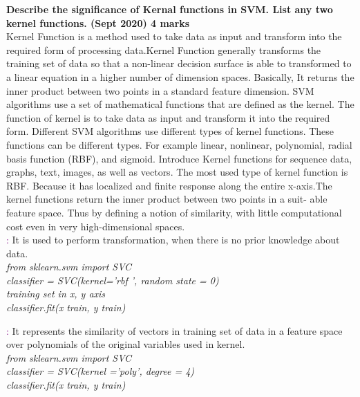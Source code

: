 \textbf{\textcolor{LightMagenta}{Describe the significance of Kernal functions in SVM. List any two kernel functions. (Sept 2020) \hfill 4 marks}} \\[5pt]
Kernel Function is a method used to take data as input and transform into the
required form of processing data.Kernel Function generally transforms the training set of
data so that a non-linear decision surface is able to transformed to a linear equation in a
higher number of dimension spaces. Basically, It returns the inner product between two
points in a standard feature dimension.
SVM algorithms use a set of mathematical functions that are defined as the kernel. The
function of kernel is to take data as input and transform it into the required form. Different
SVM algorithms use different types of kernel functions. These functions can be different
types. For example linear, nonlinear, polynomial, radial basis function (RBF), and sigmoid.
Introduce Kernel functions for sequence data, graphs, text, images, as well as vectors. The
most used type of kernel function is RBF. Because it has localized and finite response along
the entire x-axis.The kernel functions return the inner product between two points in a suit-
able feature space. Thus by defining a notion of similarity, with little computational cost
even in very high-dimensional spaces.\\
\textcolor{purple}{\underline{}:} It is used to perform transformation, when there is no prior knowledge about data. \\
\textit{from sklearn.svm import SVC \\
classifier = SVC(kernel=’rbf ’, random state = 0)\\
training set in x, y axis \\
classifier.fit(x train, y train) \\}

\textcolor{purple}{\underline{}:} It represents the similarity of vectors in training set of data in a feature space over polynomials of the original variables used in kernel.\\
\textit{from sklearn.svm import SVC \\
classifier = SVC(kernel =’poly’, degree = 4) \\
classifier.fit(x train, y train) \\}
